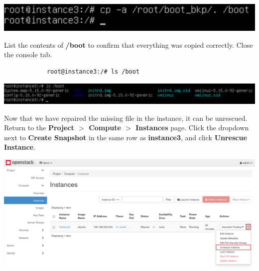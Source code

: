 \documentclass[letterpaper, 12pt]{article}
\begin{document}
\begin{enumerate}
\begin{labstep}
        \begin{center}
            \includegraphics[width=\linewidth]{images/part7/step20.png}
        \end{center}
    \end{labstep}

    \begin{labstep}
        List the contents of \textbf{/boot} to confirm that everything was copied correctly.
        Close the console tab.
        \begin{lstlisting}
            root@instance3:/# ls /boot
        \end{lstlisting}

        \begin{center}
            \includegraphics[width=\linewidth]{images/part7/step21.png}
        \end{center}
    \end{labstep}

    \begin{labstep}
        Now that we have repaired the missing file in the instance, it can be unrescued.
        Return to the \textbf{Project $>$ Compute $>$ Instances} page.
        Click the dropdown next to \textbf{Create Snapshot} in the same row as \textbf{instance3}, and click \textbf{Unrescue Instance}.

        \begin{center}
            \includegraphics[width=\linewidth]{images/part7/step22.png}
        \end{center}
    \end{labstep}


\end{enumerate}
\end{document}
